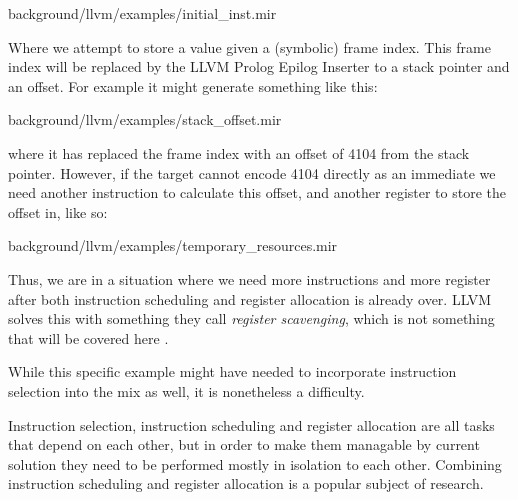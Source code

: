 
{background/llvm/examples/initial_inst.mir}

Where we attempt to store a value given a (symbolic) frame index. This frame index will be replaced by
the LLVM Prolog Epilog Inserter to a stack pointer and an offset. For example it might
generate something like this:


{background/llvm/examples/stack_offset.mir}

where it has replaced the frame index with an offset of 4104 from the stack pointer. However,
if the target cannot encode 4104 directly as an immediate we need another instruction to
calculate this offset, and another register to store the offset in, like so:


{background/llvm/examples/temporary_resources.mir}

Thus, we are in a situation where we need more instructions and more register after both
instruction scheduling and register allocation is already over. LLVM solves this with something
they call \textit{register scavenging}, which is not something that will be covered here
\cite[at~48:53]{welcome-to-backend}.

While this specific example might have needed to incorporate instruction selection into
the mix as well, it is nonetheless a difficulty.

Instruction selection, instruction scheduling and register allocation are all tasks that
depend on each other, but in order to make them managable by current solution they need
to be performed mostly in isolation to each other. Combining instruction scheduling and
register allocation is a popular subject of research.
